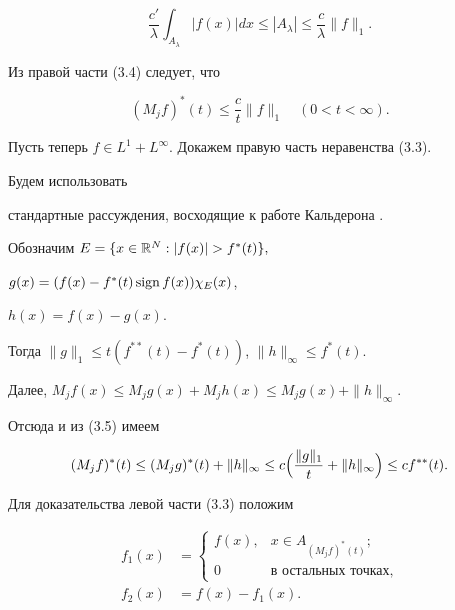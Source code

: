 \begin{equation} 


\frac{c'}{\lambda}\int_{A_\lambda}|f(x)|dx \le |A_\lambda|\le 


\frac{c}{\lambda}\|f\|_1. 


\end{equation} 


Из правой части (3.4) следует, что 


\begin{equation} 


(M_j f)^*(t) \le \frac{c}{t}\|f\|_1 \quad (0<t<\infty). 


\end{equation} 


 


Пусть теперь $f\in L^1+L^\infty$. Докажем правую часть неравенства (3.3). 


Будем использовать 


стандартные рассуждения, восходящие к работе Кальдерона \cite{Cal}. 


 


Обозначим $E=\{x\in\Bbb R^N:|f(x)|>f^*(t)\},$ 


$g(x)=(f(x)-f^*(t)\operatorname{sign} f(x))\chi_E(x)$, 


$h(x)=f(x)-g(x)$. 


Тогда $\|g\|_1\le t(f^{**}(t)-f^*(t))$, $\|h\|_\infty\le f^*(t)$. 


Далее, $M_j f(x)\le M_j g(x)+M_j h(x) \le M_j g(x)+\|h\|_\infty$. 


Отсюда и из (3.5) имеем 


$$ 


(M_j f)^*(t)\le (M_j g)^*(t)+\|h\|_\infty \le 


c\Bigl(\frac{\|g\|_1}{t}+\|h\|_\infty\Bigr) \le cf^{**}(t). 


$$ 


Для доказательства левой части (3.3) положим 


\begin{align*} 


f_1(x)&= 


\begin{cases} 


f(x), &x\in A_{(M_j f)^*(t)};\\ 


0 &\text{в остальных точках}, 


\end{cases} 


\\ 


f_2(x) &=f(x)-f_1(x). 


\end{align*} 


